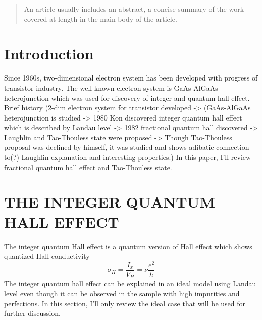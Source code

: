 \documentclass[%
 reprint,
 amsmath,amssymb,
 aps,
 prl,
]{revtex4-1}
\begin{document}
\begin{abstract}
An article usually includes an abstract, a concise summary of the work
covered at length in the main body of the article. 
\end{abstract}

\maketitle

\section{\label{sec:level1}Introduction}

Since 1960s, two-dimensional electron system has been developed with progress of transistor industry. The well-known electron system is GaAs-AlGaAs heterojunction which was used for discovery of integer and quantum hall effect.\cite{Yoshioka_QHE}
Brief history (2-dim electron system for transistor developed -> (GaAs-AlGaAs heterojunction is studied -> 1980 Kon discovered integer quantum hall effect which is described by Landau level -> 1982 fractional quantum hall discovered -> Laughlin and Tao-Thouless state were proposed -> Though Tao-Thouless proposal was declined by himself, it was studied and shows adibatic connection to(?) Laughlin explanation and interesting properties.)
In this paper, I'll review fractional quantum hall effect and Tao-Thouless state.

\section{THE INTEGER QUANTUM HALL EFFECT}
The integer quantum Hall effect is a quantum version of  Hall effect which shows quantized Hall conductivity
\begin{equation}
\sigma_{H} = \frac{I_x}{V_H} = \nu \frac{e^2}{h}
\end{equation}
The integer quantum hall effect can be explained in an ideal model using Landau level even though it can be observed in the sample with high impurities and perfections.\cite{Kittel2004} In this section, I'll only review the ideal case that will be used for further discussion.
\end{document}
